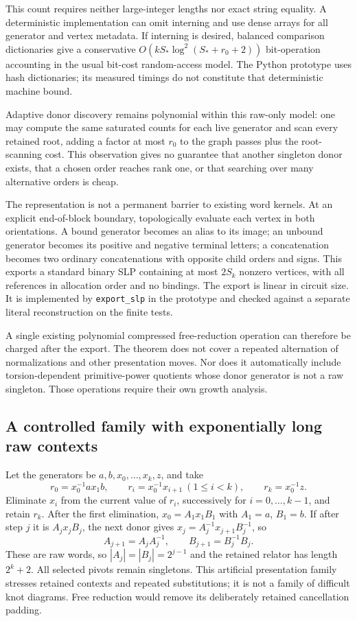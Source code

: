 This count requires neither large-integer lengths nor exact string
equality. A deterministic implementation can omit interning and use dense
arrays for all generator and vertex metadata. If interning is desired,
balanced comparison dictionaries give a conservative
$O(kS_*\log^2(S_*+r_0+2))$ bit-operation accounting in the usual
bit-cost random-access model. The Python prototype uses hash dictionaries;
its measured timings do not constitute that deterministic machine bound.

Adaptive donor discovery remains polynomial within this raw-only model:
one may compute the same saturated counts for each live generator and
scan every retained root, adding a factor at most $r_0$ to the graph
passes plus the root-scanning cost. This observation gives no guarantee
that another singleton donor exists, that a chosen order reaches rank
one, or that searching over many alternative orders is cheap.

The representation is not a permanent barrier to existing word kernels.
At an explicit end-of-block boundary, topologically evaluate each vertex
in both orientations. A bound generator becomes an alias to its image;
an unbound generator becomes its positive and negative terminal letters;
a concatenation becomes two ordinary concatenations with opposite child
orders and signs. This exports a standard binary SLP containing at most
$2S_k$ nonzero vertices, with all references in allocation order and no
bindings. The export is linear in circuit size. It is implemented by
\texttt{export\_slp} in the prototype and checked against a separate
literal reconstruction on the finite tests.

A single existing polynomial compressed free-reduction operation
\cite{schleimer2008} can
therefore be charged after the export. The theorem does not cover a
repeated alternation of normalizations and other presentation moves.
Nor does it automatically include torsion-dependent primitive-power
quotients whose donor generator is not a raw singleton. Those operations
require their own growth analysis.

\subsection{A controlled family with exponentially long raw contexts}

Let the generators be $a,b,x_0,\ldots,x_k,z$, and take
\[
 r_0=x_0^{-1}a x_1 b,\qquad
 r_i=x_0^{-1}x_{i+1}\ (1\le i<k),\qquad
 r_k=x_0^{-1}z.
\]
Eliminate $x_i$ from the current value of $r_i$, successively for
$i=0,\ldots,k-1$, and retain $r_k$. After the first elimination,
$x_0=A_1x_1B_1$ with $A_1=a$, $B_1=b$. If after step $j$ it is
$A_jx_jB_j$, the next donor gives
$x_j=A_j^{-1}x_{j+1}B_j^{-1}$, so
\[
 A_{j+1}=A_jA_j^{-1},\qquad B_{j+1}=B_j^{-1}B_j.
\]
These are raw words, so $|A_j|=|B_j|=2^{j-1}$ and the retained relator
has length $2^k+2$. All selected pivots remain singletons. This artificial
presentation family stresses retained contexts and repeated substitutions;
it is not a family of difficult knot diagrams. Free reduction would
remove its deliberately retained cancellation padding.

